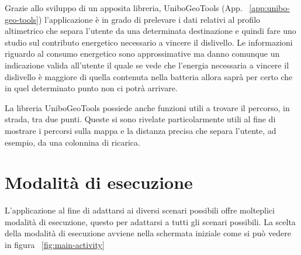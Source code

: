 Grazie allo sviluppo di un apposita libreria, UniboGeoTools (App. ~\ref{app:unibo-geo-tools}) l'applicazione è in grado di prelevare i dati relativi al profilo altimetrico che separa l'utente da una determinata destinazione e quindi fare uno studio sul contributo energetico necessario a vincere il dislivello. Le informazioni riguardo al consumo energetico sono approssimative ma danno comunque un indicazione valida all'utente il quale se vede che l'energia necessaria a vincere il dislivello è maggiore di quella contenuta nella batteria allora saprà per certo che in quel determinato punto non ci potrà arrivare.

La libreria UniboGeoTools possiede anche funzioni utili a trovare il percorso, in strada, tra due punti. Queste si sono rivelate particolarmente utili al fine di mostrare i percorsi sulla mappa e la distanza precisa che separa l'utente, ad esempio, da una colonnina di ricarica.


\section{Modalità di esecuzione}

L'applicazione al fine di adattarsi ai diversi scenari possibili offre molteplici modalità di esecuzione, questo per adattarsi a tutti gli scenari possibili. La scelta della modalità di esecuzione avviene nella schermata iniziale come si può vedere in figura ~\ref{fig:main-activity}

